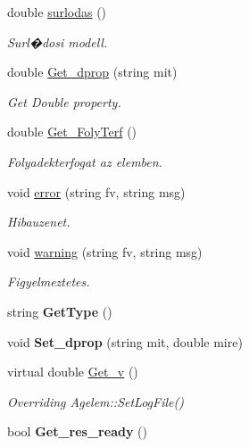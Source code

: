 \begin{DoxyCompactItemize}
\mbox{\label{class_csatorna_a8ca44a377b12883ddad100f0dea9aed2}} 
double \hyperlink{class_csatorna_a8ca44a377b12883ddad100f0dea9aed2}{surlodas} ()
\begin{DoxyCompactList}\small\item\em Surl�dosi modell. \end{DoxyCompactList}\item 
\mbox{\label{class_csatorna_a581b69e57becd825b645f07b07028051}} 
double \hyperlink{class_csatorna_a581b69e57becd825b645f07b07028051}{Get\+\_\+dprop} (string mit)
\begin{DoxyCompactList}\small\item\em Get Double property. \end{DoxyCompactList}\item 
\mbox{\label{class_csatorna_a256060fc76bcee088250b0810eaadabb}} 
double \hyperlink{class_csatorna_a256060fc76bcee088250b0810eaadabb}{Get\+\_\+\+Foly\+Terf} ()
\begin{DoxyCompactList}\small\item\em Folyadekterfogat az elemben. \end{DoxyCompactList}\item 
void \hyperlink{class_csatorna_a765dd9b66d2a18b567a6045d17266a10}{error} (string fv, string msg)
\begin{DoxyCompactList}\small\item\em Hibauzenet. \end{DoxyCompactList}\item 
void \hyperlink{class_csatorna_ac2000669171af7d8fa5f447cb8aa231d}{warning} (string fv, string msg)
\begin{DoxyCompactList}\small\item\em Figyelmeztetes. \end{DoxyCompactList}\item 
\mbox{\label{class_csatorna_a6b1b895f6b560b8bb3a517c48b12210e}} 
string {\bfseries Get\+Type} ()
\item 
\mbox{\label{class_csatorna_aa1895b07dd2d4b836f0efbe0869cd4e1}} 
void {\bfseries Set\+\_\+dprop} (string mit, double mire)
\item 
\mbox{\label{class_csatorna_a74db8402dcaaf02c408c1ac900a610f9}} 
virtual double \hyperlink{class_csatorna_a74db8402dcaaf02c408c1ac900a610f9}{Get\+\_\+v} ()
\begin{DoxyCompactList}\small\item\em Overriding Agelem\+::\+Set\+Log\+File() \end{DoxyCompactList}\item 
\mbox{\label{class_csatorna_afc26b196d6234c18ed3e1529390a10b5}} 
bool {\bfseries Get\+\_\+res\+\_\+ready} ()
\end{DoxyCompactItemize}
